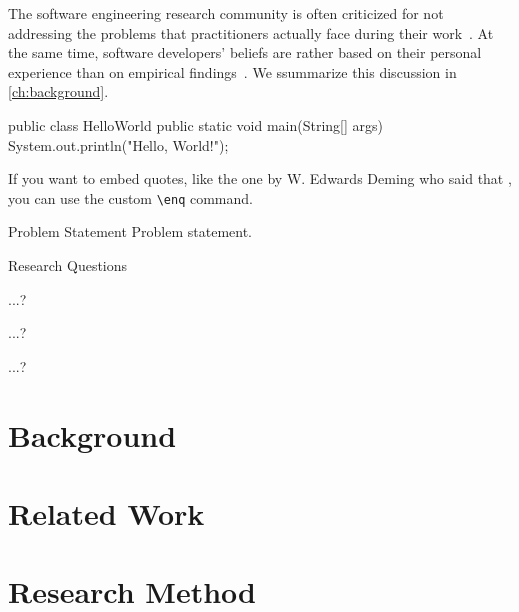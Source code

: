 The software engineering research community is often criticized for not addressing the problems that practitioners actually face during their work~\cite{Briand2012}.
At the same time, software developers' beliefs are rather based on their personal experience than on empirical findings~\cite{DevanbuZimmermannOthers2016}.
We s\textsf{s}ummarize this discussion in \autoref{ch:background}.

\begin{java}
public class HelloWorld {
  public static void main(String[] args) {
    System.out.println("Hello, World!");
  }
}
\end{java}

If you want to embed quotes, like the one by W. Edwards Deming who said that , you can use the custom \texttt{\textbackslash enq} command.


\begin{graybox}{Problem Statement}
Problem statement.
\end{graybox}


\begin{graybox}{Research Questions}
\begin{description}[style=multiline, labelindent=\parindent, leftmargin=\rqindent, itemsep=-1ex]
\item[RQ1] ...?
\item[RQ2] ...?
\item[RQ3] ...?
\end{description}
\end{graybox}

\chapter{Background}
\label{ch:background}

\lipsum[1-12]

\chapter{Related Work}
\label{ch:related-work}

\lipsum[1-4]

\chapter{Research Method}
\label{ch:research-method}


